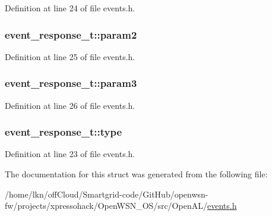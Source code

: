 Definition at line 24 of file events.\+h.

\subsubsection[{\texorpdfstring{param2}{param2}}]{ event\+\_\+response\+\_\+t\+::param2}\hypertarget{structevent__response__t_ac640c8192ad38f108bf2063f70f29c3f}{}\label{structevent__response__t_ac640c8192ad38f108bf2063f70f29c3f}


Definition at line 25 of file events.\+h.

\subsubsection[{\texorpdfstring{param3}{param3}}]{ event\+\_\+response\+\_\+t\+::param3}\hypertarget{structevent__response__t_a8e8609565de053bdd9b9a02f9a877819}{}\label{structevent__response__t_a8e8609565de053bdd9b9a02f9a877819}


Definition at line 26 of file events.\+h.

\subsubsection[{\texorpdfstring{type}{type}}]{ event\+\_\+response\+\_\+t\+::type}\hypertarget{structevent__response__t_a33850f7c5bcc5c05693bd15be488d34a}{}\label{structevent__response__t_a33850f7c5bcc5c05693bd15be488d34a}


Definition at line 23 of file events.\+h.



The documentation for this struct was generated from the following file\+:\begin{DoxyCompactItemize}
\item 
/home/lkn/off\+Cloud/\+Smartgrid-\/code/\+Git\+Hub/openwsn-\/fw/projects/xpressohack/\+Open\+W\+S\+N\+\_\+\+O\+S/src/\+Open\+A\+L/\hyperlink{events_8h}{events.\+h}\end{DoxyCompactItemize}
